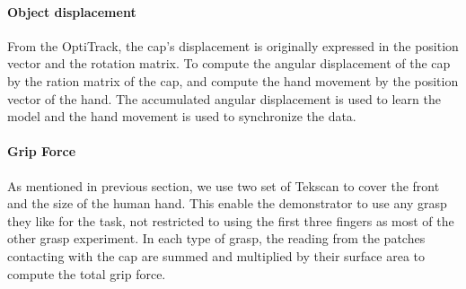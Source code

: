 \paragraph{\textbf{Object displacement}}
\label{sec:optiktrack}
From the OptiTrack, the cap's displacement is originally expressed in the position vector and the rotation matrix. To compute the angular displacement of the cap by the ration matrix of the cap, and compute the hand movement by the position vector of the hand. The accumulated angular displacement is used to learn the model and the hand movement is used to synchronize the data. %
%




\paragraph{\textbf{Grip Force}}
\label{tekscan}
As mentioned in previous section, we use two set of Tekscan to cover the front and the size of the human hand. This enable the demonstrator to use any grasp they like for the task, not restricted to using the first three fingers as most of the other grasp experiment. In each type of grasp, the reading from the patches contacting with the cap are summed and multiplied by their surface area to compute the total grip force.%

